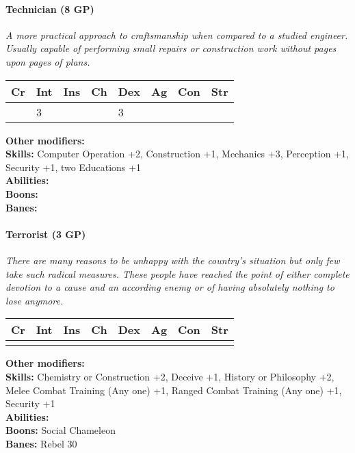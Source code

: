 \hrulefill
\paragraph*{Technician (8 GP)}
\textit{A more practical approach to craftsmanship when compared to a studied engineer. Usually capable of performing small repairs or construction work without pages upon pages of plans.}\par
\begin{tabular}{|l|l|l|l|l|l|l|l|}
    \hline
    Cr & Int & Ins & Ch & Dex & Ag & Con & Str \\ \hline
    & 3 &  &  & 3 &  &  &  \\ \hline
\end{tabular}\par
\noindent\textbf{Other modifiers:} \\
\textbf{Skills:} Computer Operation +2,
Construction +1,
Mechanics +3,
Perception +1,
Security +1,
two Educations +1\\
\textbf{Abilities:} \\
\textbf{Boons:} \\
\textbf{Banes:} \\

\hrulefill
\paragraph*{Terrorist (3 GP)}
\textit{There are many reasons to be unhappy with the country's situation but only few take such radical measures. These people have reached the point of either complete devotion to a cause and an according enemy or of having absolutely nothing to lose anymore.}\par
\begin{tabular}{|l|l|l|l|l|l|l|l|}
	\hline
	Cr & Int & Ins & Ch & Dex & Ag & Con & Str \\ \hline
	&  &  &  &  &  &  &  \\ \hline
\end{tabular}\par
\noindent\textbf{Other modifiers:} \\
\textbf{Skills:} Chemistry or Construction +2,
Deceive +1,
History or Philosophy +2,
Melee Combat Training (Any one) +1,
Ranged Combat Training (Any one) +1,
Security +1\\
\textbf{Abilities:} \\
\textbf{Boons:} Social Chameleon\\
\textbf{Banes:} Rebel 30\\

